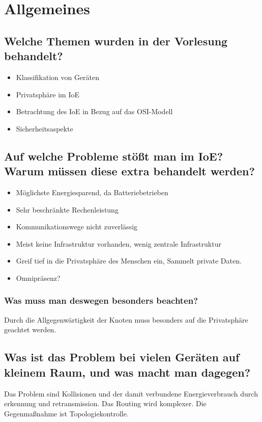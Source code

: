 \section{Allgemeines}
	\subsection{Welche Themen wurden in der Vorlesung behandelt?}
		\begin{itemize}
			\item Klassifikation von Geräten
			\item Privatsphäre im IoE
			\item Betrachtung des IoE in Bezug auf das OSI-Modell
			\item Sicherheitsaspekte
		\end{itemize}
	
	\subsection{Auf welche Probleme stößt man im IoE? Warum müssen diese extra behandelt werden?}
		\begin{itemize}
			\item Möglichste Energiesparend, da Batteriebetrieben
			\item Sehr beschränkte Rechenleistung
			\item Kommunikationswege nicht zuverlässig
			\item Meist keine Infrastruktur vorhanden, wenig zentrale Infrastruktur
			\item Greif tief in die Privatsphäre des Menschen ein, Sammelt private Daten.
			\item Omnipräsenz?
		\end{itemize}
	\subsubsection{Was muss man deswegen besonders beachten?}
		Durch die Allgegenwärtigkeit der Knoten muss besonders auf die Privatsphäre geachtet werden.
		
	\subsection{Was ist das Problem bei vielen Geräten auf kleinem Raum, und was macht man dagegen?}
	Das Problem sind Kollisionen und der damit verbundene Energieverbrauch durch erkennung und retransmission. Das Routing wird komplexer. Die Gegenmaßnahme ist Topologiekontrolle.
	
